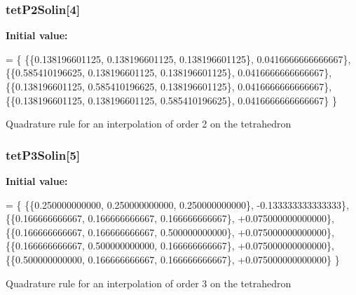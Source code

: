 \subsubsection[{tet\-P2\-Solin}]{ tet\-P2\-Solin[4]}\label{GaussQuadratureTet_8cc_a6c916bc9418044d9a9f2778bbcde9aca}
{\bfseries Initial value\-:}
\begin{DoxyCode}
= \{
  \{\{0.138196601125, 0.138196601125, 0.138196601125\}, 0.0416666666666667\},
  \{\{0.585410196625, 0.138196601125, 0.138196601125\}, 0.0416666666666667\},
  \{\{0.138196601125, 0.585410196625, 0.138196601125\}, 0.0416666666666667\},
  \{\{0.138196601125, 0.138196601125, 0.585410196625\}, 0.0416666666666667\}
\}
\end{DoxyCode}
Quadrature rule for an interpolation of order 2 on the tetrahedron 
\subsubsection[{tet\-P3\-Solin}]{ tet\-P3\-Solin[5]}\label{GaussQuadratureTet_8cc_a18ce0e5f7e5990ecb5b616e1e3d8227b}
{\bfseries Initial value\-:}
\begin{DoxyCode}
= \{
  \{\{0.250000000000, 0.250000000000, 0.250000000000\}, -0.133333333333333\},
  \{\{0.166666666667, 0.166666666667, 0.166666666667\}, +0.075000000000000\},
  \{\{0.166666666667, 0.166666666667, 0.500000000000\}, +0.075000000000000\},
  \{\{0.166666666667, 0.500000000000, 0.166666666667\}, +0.075000000000000\},
  \{\{0.500000000000, 0.166666666667, 0.166666666667\}, +0.075000000000000\}
\}
\end{DoxyCode}
Quadrature rule for an interpolation of order 3 on the tetrahedron 
